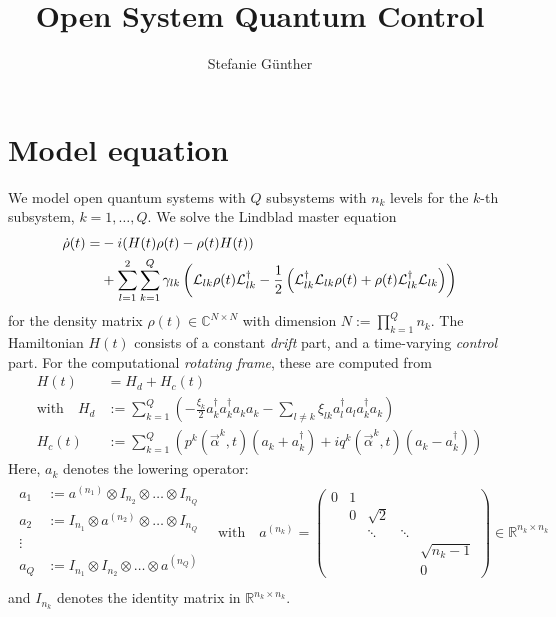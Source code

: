 \documentclass[letterpaper]{article}
\title{Open System Quantum Control}
\author{Stefanie G{\"u}nther}
\newcommand{\Ell}{\mathcal{L}}
\newcommand{\R}{\mathds{R}}
\newcommand{\C}{\mathds{C}}
\begin{document}
\maketitle

\section{Model equation}
We model open quantum systems with $Q$ subsystems with $n_k$ levels for the
$k$-th subsystem, $k=1,\dots,Q$. We solve the Lindblad master equation
\begin{align}\label{mastereq}
  \dot \rho(t) = &-i(H(t)\rho(t) - \rho(t)H(t)) \notag \\
  &+ \sum_{l=1}^2 \sum_{k=1}^Q \gamma_{lk} \left( \Ell_{lk} \rho(t)
  \Ell_{lk}^{\dagger} - \frac 1 2 \left( \Ell_{lk}^{\dagger}\Ell_{lk}
  \rho(t) + \rho(t)\Ell_{lk}^{\dagger} \Ell_{lk}\right) \right)
\end{align}
for the density matrix $\rho(t)\in \C^{N\times N}$ with dimension $N :=
\prod_{k=1}^Q n_k$. The Hamiltonian $H(t)$ consists of a constant \textit{drift}
part, and a time-varying \textit{control} part. For the computational
\textit{rotating frame}, these are computed from
\begin{align}
  H(t) &= H_d + H_c(t) \\
  \text{with} \quad H_d &:= \sum_{k=1}^Q \left(- \frac{\xi_k}{2}
  a_k^{\dagger}a_k^{\dagger}a_k a_k - \sum_{l\neq k} \xi_{lk} a_l^{\dagger}a_l
  a_k^{\dagger} a_k  \right) \\
   H_c(t) &:= \sum_{k=1}^Q \left( p^k(\vec{\alpha}^k,t) (a_k +
   a_k^{\dagger}) + i q^k(\vec{\alpha}^k,t)(a_k - a_k^{\dagger})
   \right)
\end{align}
Here, $a_k$ denotes the lowering operator:
\begin{align}
  \begin{array}{rl}
  a_1 &:= a^{(n_1)} \otimes I_{n_2} \otimes \dots \otimes I_{n_Q}\\
  a_2 &:= I_{n_1} \otimes a^{(n_2)} \otimes \dots \otimes I_{n_Q}\\
  \vdots \, & \\
  a_Q &:= I_{n_1} \otimes I_{n_2} \otimes \dots \otimes a^{(n_Q)}\\
  \end{array}
  \quad \text{with}\quad
 a^{(n_k)} = \begin{pmatrix}
   0 & 1 &          &         &    \\
     & 0 & \sqrt{2} &         &     \\
     &   & \ddots   & \ddots  &    \\
     &   &          &         & \sqrt{n_k-1}  \\
     &   &          &         & 0   
 \end{pmatrix} \in \R^{n_k \times n_k}
\end{align}
and $I_{n_k}$ denotes the identity matrix in $\R^{n_k \times n_k}$.
\end{document}
